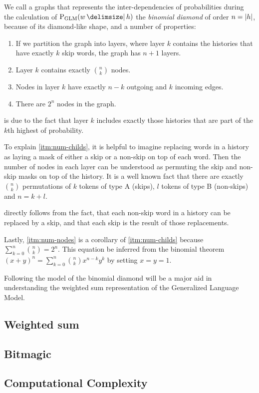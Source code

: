 We call a graphs that represents the inter-dependencies of probabilities during
the calculation of $\ProbGLM{w}{h}$ the \emph{binomial diamond} of order
$n = \left|h\right|$, because of its diamond-like shape, and a number of
properties:

\begin{enumerate}
  \item \label{itm:num-layers} If we partition the graph into layers, where
    layer $k$ contains the histories that have exactly $k$ skip words, the graph
    has $n + 1$ layers.
  \item \label{itm:num-childs}  Layer $k$ contains exactly $\binom{n}{k}$ nodes.
  \item \label{itm:num-edges}   Nodes in layer $k$ have exactly $n - k$ outgoing
    and $k$ incoming edges.
  \item \label{itm:num-nodes}  There are $2^n$ nodes in the graph.
\end{enumerate}

 is due to the fact that layer $k$ includes exactly those
histories that are part of the $k$th highest of probability.

To explain \cref{itm:num-childs}, it is helpful to imagine replacing words in
a history as laying a mask of either a skip or a non-skip on top of each word.
Then the number of nodes in each layer can be understood as permuting the
skip and non-skip masks on top of the history.
It is a well known fact that there are exactly $\binom{n}{k}$ permutations of
$k$ tokens of type A (skips), $l$ tokens of type B (non-skips) and $n = k + l$.

 directly follows from the fact, that each non-skip word
in a history can be replaced by a skip, and that each skip is the result
of those replacements.

Lastly, \cref{itm:num-nodes} is a corollary of \cref{itm:num-childs} because
$\sum_{k=0}^n \binom{n}{k} = 2^n$. This equation be inferred from the binomial
theorem $(x+ y)^n = \sum_{k=0}^n \binom{n}{k} x^{n-k} y^k$ by setting
${x = y = 1}$.

Following the model of the binomial diamond will be a major aid in understanding
the weighted sum representation of the Generalized Language Model.

\subsection{Weighted sum}

\subsection{Bitmagic}

\subsection{Computational Complexity}
